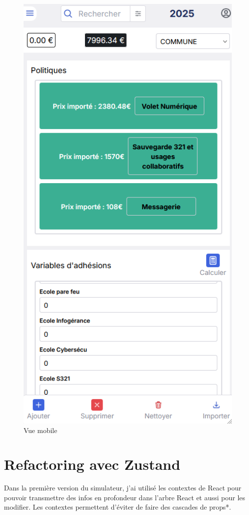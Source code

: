 \documentclass[a4paper,12pt]{report}
\begin{document}
\begin{figure}[H]
    \centering
    \includegraphics[scale=0.4]{vueMobile.png}
    \caption{Vue mobile}
    \label{fig:mobile-view}
\end{figure}


\section{Refactoring avec Zustand}
Dans la première version du simulateur, j'ai utilisé les contextes de React pour pouvoir transmettre des infos en profondeur dans l'arbre React et aussi pour les modifier. Les contextes permettent d'éviter de faire des cascades de props*.
\end{document}
